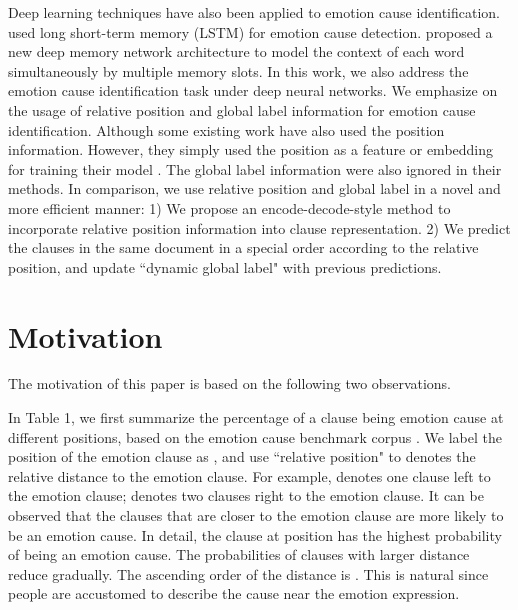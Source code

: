 \documentclass[letterpaper]{article} \usepackage{aaai19}  \usepackage{times}  \usepackage{helvet}  \usepackage{courier}  \usepackage{url}  \usepackage{graphicx}  \frenchspacing  \setlength{\pdfpagewidth}{8.5in}  \setlength{\pdfpageheight}{11in}  \setcounter{secnumdepth}{0}
\begin{document}
Deep learning techniques have also been applied to emotion cause identification. \cite{cheng2017emotion} used long short-term memory (LSTM) for emotion cause detection. \cite{gui2017question} proposed a new deep memory network architecture to model the context of each word simultaneously by multiple memory slots. In this work, we also address the emotion cause identification task under deep neural networks.  We emphasize on the usage of relative position and global label information for emotion cause identification. Although some existing work have also used the position information. However, they simply used the position as a feature or embedding for training their model \cite{gui2016event,gui2017question,xu2017ensemble}. The global label information were also ignored in their methods. In comparison, we use relative position and global label in a novel and more efficient manner: 1) We propose an encode-decode-style method to incorporate relative position information into clause representation. 2) We predict the clauses in the same document in a special order according to the relative position, and update ``dynamic global label" with previous predictions.



\section{Motivation}
The motivation of this paper is based on the following two observations.

In Table 1, we first summarize the percentage of a clause being emotion cause at different positions, based on the emotion cause benchmark corpus \cite{gui2016event}. We label the position of the emotion clause as , and use ``relative position" to denotes the relative distance to the emotion clause. For example,   denotes one clause left to the emotion clause;  denotes two clauses right to the emotion clause. It can be observed that the clauses that are closer to the emotion clause are more likely to be an emotion cause. In detail, the clause at position  has the highest probability of being an emotion cause. The probabilities of clauses with larger distance reduce gradually. The ascending order of the distance is . This is natural since people are accustomed to describe the cause near the emotion expression.
\end{document}
